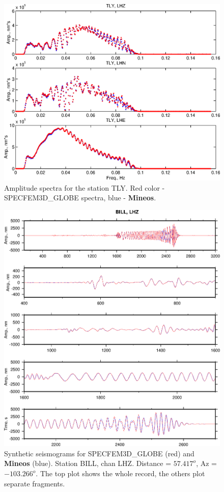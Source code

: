 \begin{figure}
\begin{center}
\includegraphics[width=7 in]{Figures/FspTLY}
\caption{Amplitude spectra for the station TLY. Red color - SPECFEM3D\_GLOBE spectra, blue - {\bf Mineos}.}
\label{fig:12a}
\end{center}
\end{figure}


\begin{figure}
\begin{center}
\includegraphics[width=7 in]{Figures/FigsBILLLHZ}
\caption{Synthetic seismograms for SPECFEM3D\_GLOBE (red) and {\bf Mineos} (blue). Station BILL, chan LHZ. 
Distance = $57.417^o$, Az = $-103.266^o$.
The top plot shows the whole record, the others plot separate fragments. }
\label{fig:13a}
\end{center}
\end{figure}

